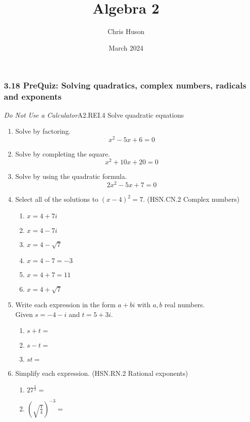 \documentclass[12pt, twoside]{article}
\title{Algebra 2}
\author{Chris Huson}
\date{March 2024}
\begin{document}
\subsubsection*{3.18 PreQuiz: Solving quadratics, complex numbers, radicals and exponents }
\emph{Do Not Use a Calculator}\hfill A2.REI.4 Solve quadratic equations
\begin{enumerate}

\item Solve by factoring.
$$x^2 - 5x + 6 = 0$$ \vspace{3cm}

\item Solve by completing the square.
$$x^2 + 10x + 20 = 0$$ \vspace{6cm}

\item Solve by using the quadratic formula.
$$2x^2 - 5x + 7 = 0$$ \vspace{4cm}

\newpage 
\item Select all of the solutions to $(x-4)^2=7$. \hfill (HSN.CN.2 Complex numbers)
    \begin{multicols}{2}
    \begin{enumerate}
        \item $x= 4+7i$
        \item $x= 4-7i$
        \item $x= 4 - \sqrt{7}$
        \item $x= 4-7 = -3$
        \item $x= 4+7 = 11$
        \item $x= 4 + \sqrt{7}$
    \end{enumerate}
    \end{multicols}

\item Write each expression in the form $a+bi$ with $a,b$ real numbers. \\[0.25cm]
    Given  $s = -4 - i $ and $t = 5 + 3i$.
        \begin{enumerate}[itemsep=1.5cm]
            \item $s+t =$
            \item $s-t =$
            \item $st =$
        \end{enumerate} \vspace{3cm}

\item Simplify each expression. \hfill (HSN.RN.2 Rational exponents)
    \begin{multicols}{2}
    \begin{enumerate}[itemsep=0.5cm]
        \item $\displaystyle 27^{\frac{2}{3}} =$
        \item $\left( \sqrt{\frac{1}{4}} \right)^{-3} =$
    \end{enumerate}
    \end{multicols} \vspace{3cm}


\end{enumerate}
\end{document}
